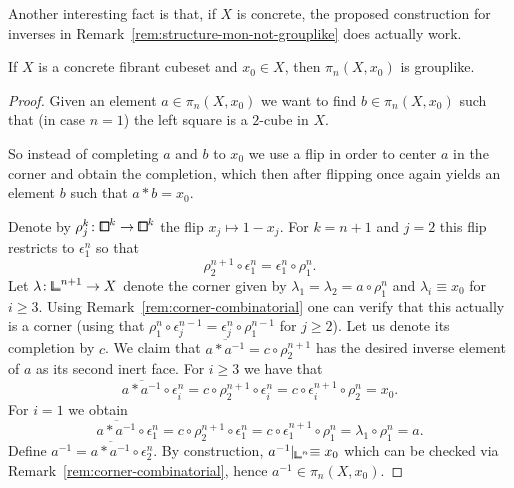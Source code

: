 Another interesting fact is that, if $X$ is concrete,
the proposed construction for inverses in Remark~\ref{rem:structure-mon-not-grouplike}
does actually work.

\begin{proposition}\label{prop:concrete-structure-group-is-group}
If $X$ is a concrete fibrant cubeset and $x_0\in X$, then $\pi_n(X,x_0)$ is grouplike.
\end{proposition}

\begin{proof}
Given an element $a\in\pi_n(X,x_0)$ we want to find $b\in\pi_n(X,x_0)$
such that (in case $n=1$) the left square is a $2$-cube in $X$.
\begin{center}
\end{center}
So instead of completing $a$ and $b$ to $x_0$ we use a flip in order to center $a$ in the corner
and obtain the completion, which then after flipping once again yields an element $b$ such that $a*b = x_0$.

Denote by $\rho_j^k\colon{\bbox}^{k}\to{\bbox}^{k}$ the flip $x_j\mapsto 1-x_j$.
For $k=n+1$ and $j=2$ this flip restricts to $\epsilon_1^n$ so that
\[
    \rho_2^{n+1}\circ\epsilon_1^n = \epsilon_1^n\circ\rho_1^n.
\]
Let $\lambda\colon{\bbcor}^{n+1}\to X$ denote the corner given by $\lambda_1 = \lambda_2 = a\circ\rho_1^n$
and $\lambda_i \equiv x_0$ for $i\geq 3$.
Using Remark~\ref{rem:corner-combinatorial} one can verify that this actually is a corner
(using that $\rho_1^n\circ\epsilon_j^{n-1} = \epsilon_j^n\circ\rho_1^{n-1}$ for $j\geq 2$).
Let us denote its completion by $c$.
We claim that $\overline{a*a^{-1}} = c\circ\rho_2^{n+1}$ has the desired inverse element of $a$ as its second inert face.
For $i\geq 3$ we have that
\[
    \overline{a*a^{-1}}\circ\epsilon_i^n = c\circ\rho_2^{n+1}\circ\epsilon_i^n
    = c\circ\epsilon_i^{n+1}\circ\rho_2^n = x_0.
\]
For $i=1$ we obtain
\[
    \overline{a*a^{-1}}\circ\epsilon_1^n = c\circ\rho_2^{n+1}\circ\epsilon_1^n = c\circ\epsilon_1^{n+1}\circ\rho_1^n = \lambda_1\circ\rho_1^n = a.
\]
Define $a^{-1} = \overline{a*a^{-1}}\circ\epsilon_2^n$.
By construction, $a^{-1}\lvert_{{\bbcor}^n} \equiv x_0$
which can be checked via Remark~\ref{rem:corner-combinatorial},
hence $a^{-1}\in\pi_n(X,x_0)$.


\end{proof}
